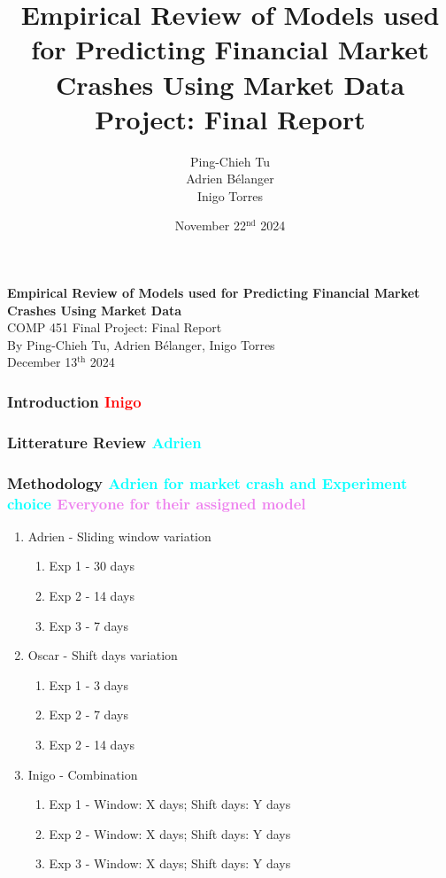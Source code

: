\documentclass[12pt, letterpaper]{article}
\title{Empirical Review of Models used for Predicting Financial Market Crashes Using Market Data \\[1em] \large Project: Final Report}
\author{\normalsize Ping-Chieh Tu \\ Adrien Bélanger \\ Inigo Torres}
\date{\vspace{2em} November 22$^{\text{nd}}$ 2024}
\begin{document}
\begin{titlepage}
    \centering
    \vspace*{2in}
    {\LARGE \textbf{Empirical Review of Models used for Predicting Financial Market Crashes Using Market Data}}\\
    \vspace*{0.5in}
    {\large COMP 451 Final Project: Final Report}\\[4in]
    \normalsize
    By Ping-Chieh Tu, Adrien Bélanger, Inigo Torres \\ [3em]
    December 13$^{\text{th}}$ 2024
\end{titlepage}
\pagebreak

\subsubsection*{Introduction \textcolor{red}{Inigo}}

\subsubsection*{Litterature Review \textcolor{cyan}{Adrien}}

\subsubsection*{Methodology \textcolor{cyan}{Adrien for market crash and Experiment choice} \textcolor{violet}{Everyone for their assigned model}}
    \begin{enumerate}
        \item Adrien - Sliding window variation
            \begin{enumerate}
                \item Exp 1 - 30 days
                \item Exp 2 - 14 days
                \item Exp 3 - 7 days
            \end{enumerate}
        \item Oscar - Shift days variation
            \begin{enumerate}
                \item Exp 1 - 3 days
                \item Exp 2 - 7 days
                \item Exp 2 - 14 days
            \end{enumerate}
        \item Inigo - Combination
            \begin{enumerate}
                \item Exp 1 - Window: X days; Shift days: Y days
                \item Exp 2 - Window: X days; Shift days: Y days
                \item Exp 3 - Window: X days; Shift days: Y days
            \end{enumerate}
    \end{enumerate}
\end{document}

